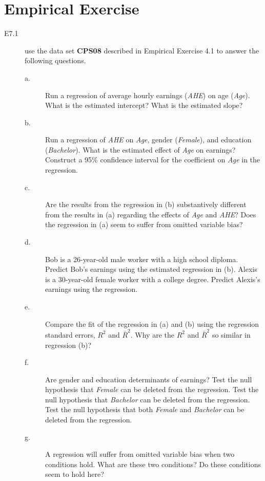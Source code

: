 \documentclass[a4paper,11pt]{article}
\begin{document}
\section*{Empirical Exercise}
\label{sec:orgc8f98de}
\begin{description}
\item[{E7.1}] use the data set \textbf{CPS08} described in Empirical Exercise 4.1
to answer the following questions.
\begin{description}
\item[{a.}] Run a regression of average hourly earnings (\emph{AHE}) on age
(\emph{Age}). What is the estimated intercept? What is the
estimated slope?
\item[{b.}] Run a regression of \emph{AHE} on \emph{Age}, gender (\emph{Female}), and
education (\emph{Bachelor}). What is the estimated effect of
\emph{Age} on earnings? Construct a 95\% confidence interval for
the coefficient on \emph{Age} in the regression.
\item[{c.}] Are the results from the regression in (b) substantively
different from the results in (a) regarding the effects of
\emph{Age} and \emph{AHE}? Does the regression in (a) seem to suffer
from omitted variable bias?
\item[{d.}] Bob is a 26-year-old male worker with a high school
diploma. Predict Bob's earnings using the estimated
regression in (b). Alexis is a 30-year-old female worker
with a college degree. Predict Alexis's earnings using the regression.
\item[{e.}] Compare the fit of the regression in (a) and (b) using the
regression standard errors, \(R^2\) and \(\bar{R}^2\). Why are
the \(R^2\) and \(\bar{R}^2\) so similar in regression (b)?
\item[{f.}] Are gender and education determinants of earnings? Test the
null hypothesis that \emph{Female} can be deleted from the
regression. Test the null hypothesis that \emph{Bachelor} can be
deleted from the regression. Test the null hypothesis that
both \emph{Female} and \emph{Bachelor} can be deleted from the
regression.
\item[{g.}] A regression will suffer from omitted variable bias when two
conditions hold. What are these two conditions? Do these
conditions seem to hold here?
\end{description}
\end{description}
\end{document}
